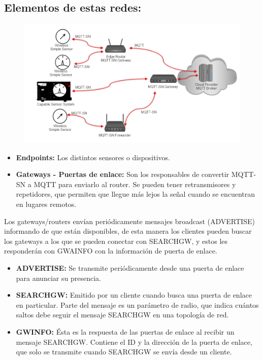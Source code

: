 \documentclass[12pt]{report} %
\begin{document}
\subsection{Elementos de estas redes:}
\begin{figure}[H]
	{\includegraphics[scale=.35]{15a80880-30ad-472a-bf98-254556798207.png}}
\end{figure}
\begin{itemize}
	\item \textbf{Endpoints:} Los distintos sensores o dispositivos.
	\item \textbf{Gateways - Puertas de enlace:} Son los responsables de convertir MQTT-SN a MQTT para enviarlo al router. Se pueden tener retransmisores y repetidores, que permiten que llegue más lejos la señal cuando se encuentran en lugares remotos.
\end{itemize}

Los gateways/routers envían periódicamente mensajes broadcast (ADVERTISE) informando de que están disponibles, de esta manera los clientes pueden buscar los gateways a los que se pueden conectar con SEARCHGW, y estos les responderán con GWAINFO con la información de puerta de enlace.
\begin{itemize}
	\item \textbf{ADVERTISE:} Se transmite periódicamente desde una puerta de enlace para anunciar su presencia.
	\item \textbf{SEARCHGW:} Emitido por un cliente cuando busca una puerta de enlace en particular. Parte del mensaje es un parámetro de radio, que indica cuántos saltos debe seguir el mensaje SEARCHGW en una topología de red.
	\item \textbf{GWINFO:} Ésta es la respuesta de las puertas de enlace al recibir un mensaje SEARCHGW. Contiene el ID y la dirección de la puerta de enlace, que solo se transmite cuando SEARCHGW se envía desde un cliente.
\end{itemize}
\end{document}
